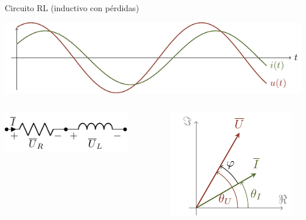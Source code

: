 \documentclass[aspectratio=169, usenames,svgnames,dvipsnames]{beamer}
\begin{document}
\begin{frame}[label={sec:org76e6274}]{Circuito RL (inductivo con pérdidas)}
\begin{center}
\includegraphics[height=0.25\textheight]{../figs/inductivo.pdf}
\end{center}
\begin{columns}
\begin{column}{0.45\columnwidth}
\begin{center}
\includegraphics[width=0.8\textwidth]{../figs/RL.pdf}
\end{center}
\end{column}


\begin{column}{0.55\columnwidth}
\begin{center}
\includegraphics[height=0.5\textheight]{../figs/fasorInductanciaReal_VI.pdf}
\end{center}
\end{column}
\end{columns}
\end{frame}
\end{document}
